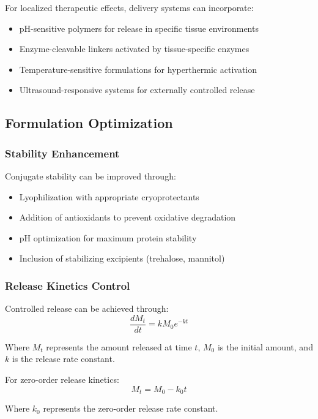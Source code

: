 \documentclass[11pt,a4paper]{article}
\begin{document}
For localized therapeutic effects, delivery systems can incorporate:
\begin{itemize}
\item pH-sensitive polymers for release in specific tissue environments
\item Enzyme-cleavable linkers activated by tissue-specific enzymes
\item Temperature-sensitive formulations for hyperthermic activation
\item Ultrasound-responsive systems for externally controlled release
\end{itemize}

\subsection{Formulation Optimization}

\subsubsection{Stability Enhancement}

Conjugate stability can be improved through:
\begin{itemize}
\item Lyophilization with appropriate cryoprotectants
\item Addition of antioxidants to prevent oxidative degradation
\item pH optimization for maximum protein stability
\item Inclusion of stabilizing excipients (trehalose, mannitol)
\end{itemize}

\subsubsection{Release Kinetics Control}

Controlled release can be achieved through:
\begin{equation}
\frac{dM_t}{dt} = kM_0e^{-kt}
\end{equation}

Where $M_t$ represents the amount released at time $t$, $M_0$ is the initial amount, and $k$ is the release rate constant.

For zero-order release kinetics:
\begin{equation}
M_t = M_0 - k_0t
\end{equation}

Where $k_0$ represents the zero-order release rate constant.
\end{document}

